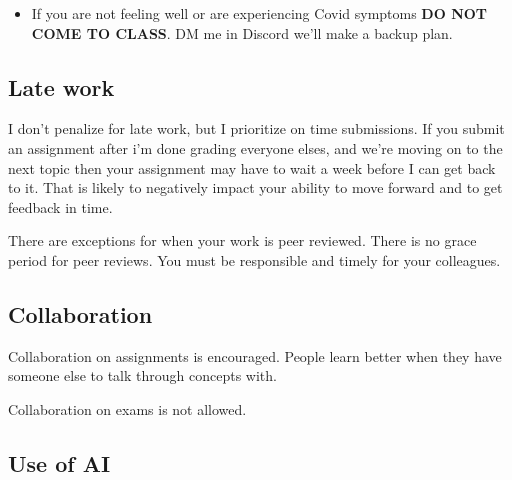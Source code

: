 \documentclass[
  letterpaper,
  DIV=11,
  numbers=noendperiod]{scrartcl}
\providecommand{\tightlist}{%
  \setlength{\itemsep}{0pt}\setlength{\parskip}{0pt}}\usepackage{longtable,booktabs,array}
\begin{document}
\begin{itemize}
\tightlist
\item
  If you are not feeling well or are experiencing Covid symptoms
  \textbf{DO NOT COME TO CLASS}. DM me in Discord we'll make a backup
  plan.
\end{itemize}

\hypertarget{late-work}{%
\subsection{Late work}\label{late-work}}

I don't penalize for late work, but I prioritize on time submissions. If
you submit an assignment after i'm done grading everyone elses, and
we're moving on to the next topic then your assignment may have to wait
a week before I can get back to it. That is likely to negatively impact
your ability to move forward and to get feedback in time.

There are exceptions for when your work is peer reviewed. There is no
grace period for peer reviews. You must be responsible and timely for
your colleagues.

\hypertarget{collaboration}{%
\subsection{Collaboration}\label{collaboration}}

Collaboration on assignments is encouraged. People learn better when
they have someone else to talk through concepts with.

\begin{tcolorbox}[enhanced jigsaw, opacitybacktitle=0.6, leftrule=.75mm, colframe=quarto-callout-warning-color-frame, colbacktitle=quarto-callout-warning-color!10!white, bottomtitle=1mm, breakable, rightrule=.15mm, colback=white, coltitle=black, arc=.35mm, left=2mm, titlerule=0mm, bottomrule=.15mm, title=\textcolor{quarto-callout-warning-color}{\faExclamationTriangle}\hspace{0.5em}{Warning}, toprule=.15mm, toptitle=1mm, opacityback=0]

Collaboration on exams is not allowed.

\end{tcolorbox}

\hypertarget{use-of-ai}{%
\subsection{Use of AI}\label{use-of-ai}}
\end{document}
